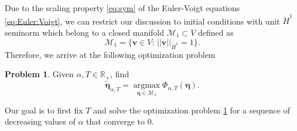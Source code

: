\documentclass[leqno,10pt,a4paper]{amsart}
\theoremstyle{definition}
\newtheorem{problem}[thm]{Problem}
\numberwithin{equation}{section}
\newcommand{\mbb}[1]{\mathbb{#1}}
\DeclareMathOperator*{\argmax}{argmax}
\newcommand{\bds}{\boldsymbol}
\def\bbeta{\boldsymbol{\eta}}
\def\teta{\widetilde{\boldsymbol{\eta}}}
\def\M{\mathcal{M}}
\begin{document}
Due to the scaling property \eqref{eq:sym} of the Euler-Voigt equations \eqref{eq:Euler:Voigt},  
we can restrict our discussion to initial conditions with
unit $\dot H^1$ seminorm which belong to a closed manifold
$\M_1 \subset V$ defined as
\begin{equation}\label{eq:M1}
\M_1 = \{\bds v \in V:\,  ||\bds v||_{\dot H^1} = 1\}.
\end{equation}
Therefore, we  arrive at the following optimization problem
%
\begin{problem}\label{pb:H3}
Given $\alpha, T \in \mbb R_+$, find 
%
\begin{equation}
\teta_{\alpha, T} = \argmax\limits_{\bbeta \in \M_{1}} \Phi_{\alpha, T}(\bbeta).
\end{equation}
%
\end{problem}
Our goal is to first fix $T$ and solve the optimization problem \ref{pb:H3} for a sequence of decreasing values of $\alpha$ that converge to 0.


\end{document}
